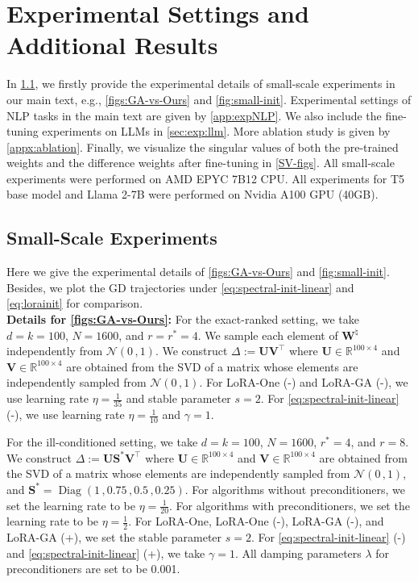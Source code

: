 \section{Experimental Settings and Additional Results}
\label{exp-settings}

In \cref{exp:toy-setting}, we firstly provide the experimental details of small-scale experiments in our main text, e.g., \cref{figs:GA-vs-Ours} and \cref{fig:small-init}. 
Experimental settings of NLP tasks in the main text are given by \cref{app:expNLP}.
We also include the fine-tuning experiments on LLMs in \cref{sec:exp:llm}.
More ablation study is given by \cref{appx:ablation}. Finally, we visualize the singular values of both the pre-trained weights and the difference weights after fine-tuning in \cref{SV-figs}. All small-scale experiments were performed on AMD EPYC 7B12 CPU. All experiments for T5 base model and Llama 2-7B were performed on Nvidia A100 GPU (40GB).

\subsection{Small-Scale Experiments}
\label{exp:toy-setting}

Here we give the experimental details of \cref{figs:GA-vs-Ours} and \cref{fig:small-init}. Besides, we plot the GD trajectories under \eqref{eq:spectral-init-linear} and \eqref{eq:lorainit} for comparison.\\

\noindent
{\bf Details for \cref{figs:GA-vs-Ours}:} For the exact-ranked setting, we take $d=k=100$, $N=1600$, and $r=r^*=4$. We sample each element of $\bm W^\natural$ independently from $\mathcal{N}(0\,,1)$. We construct $\Delta:=\bm U \bm V^{\!\top}$ where $\bm U\in\mathbb{R}^{100\times 4}$ and $\bm V\in\mathbb{R}^{100\times 4}$ are obtained from the SVD of a matrix whose elements are independently sampled from $\mathcal{N}(0\,,1)$. For LoRA-One (-) and LoRA-GA (-), we use learning rate $\eta=\frac{1}{35}$ and stable parameter $s=2$. For \eqref{eq:spectral-init-linear} (-), we use learning rate $\eta=\frac{1}{10}$ and $\gamma=1$. 

For the ill-conditioned setting, we take $d=k=100$, $N=1600$, $r^*=4$, and $r=8$. We construct $\Delta:=\bm U \bm S^* \bm V^{\!\top}$ where $\bm U\in\mathbb{R}^{100\times 4}$ and $\bm V\in\mathbb{R}^{100\times 4}$ are obtained from the SVD of a matrix whose elements are independently sampled from $\mathcal{N}(0\,,1)$, and $\bm S^*=\operatorname{Diag}\left(1\,,0.75\,,0.5\,,0.25\right)$. For algorithms without preconditioners, we set the learning rate to be $\eta=\frac{1}{20}$. For algorithms with preconditioners, we set the learning rate to be $\eta=\frac{1}{2}$. For LoRA-One, LoRA-One (-), LoRA-GA (-), and LoRA-GA (+), we set the stable parameter $s=2$. For \eqref{eq:spectral-init-linear} (-) and \eqref{eq:spectral-init-linear} (+), we take $\gamma=1$. All damping parameters $\lambda$ for preconditioners are set to be 0.001.\\

